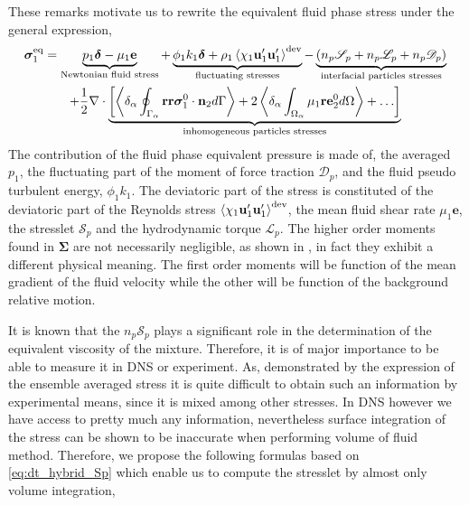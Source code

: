 These remarks motivate us to rewrite the equivalent fluid phase stress under the general expression,  
\begin{multline*}
    \bm{\sigma}_1^\text{eq}
    = 
    \underbrace{p_1  \bm\delta
    - \mu_1 \textbf{e} }_\text{Newtonian fluid stress}
    +  \underbrace{\phi_1 k_1 \bm\delta
    + \rho_1 \left<\chi_1\textbf{u}_1'\textbf{u}_1'\right>^\text{dev}}_\text{fluctuating stresses}
    - \underbrace{(n_p \mathscr{S}_p
    + n_p \mathscr{L}_p
    + n_p \mathscr{D}_p )}_\text{interfacial particles stresses}\\
    + \frac{1}{2} \mathbf{\nabla}\cdot \underbrace{\left[
        \left<\delta_\alpha \oint_{\Gamma_\alpha} \textbf{rr}\bm{\sigma}_1^0\cdot \textbf{n}_2 d\Gamma\right>
        + 2\left<\delta_\alpha \int_{\Omega_\alpha} \mu_1 \textbf{re}_2^0  d\Omega\right>
        + \ldots
        \right]
        }_\text{inhomogeneous particles stresses}
    \label{eq:sigma_eq1_def}
\end{multline*}
The contribution of the fluid phase equivalent pressure is made of,
the averaged $p_1$, the fluctuating part of the moment of force traction $\mathscr{D}_p$, and the fluid pseudo turbulent energy, $\phi_1 k_1$. 
The deviatoric part of the stress is constituted of the deviatoric part of the Reynolds stress $\left<\chi_1\textbf{u}_1'\textbf{u}_1'\right>^\text{dev}$, the mean fluid shear rate $\mu_1 \textbf{e}$, the stresslet $\mathscr{S}_p$ and the hydrodynamic torque $\mathscr{L}_p$. 
The higher order moments found in $\bm{\Sigma}$ are not necessarily negligible, as shown in \citet{lhuillier1996contribution,jackson1997locally}, in fact they exhibit a different physical meaning. 
The first order moments will be function of the mean gradient of the fluid velocity while the other will be function of the background relative motion. 

It is known that the $n_p \mathscr{S}_p$ plays a significant role in the determination of the equivalent viscosity of the mixture. 
Therefore, it is of major importance to be able to measure it in DNS or experiment.
As, demonstrated by the expression of the ensemble averaged stress it is quite difficult to obtain such an information by experimental means, since it is mixed among other stresses.  
In DNS however we have access to pretty much any information, nevertheless surface integration of the stress can be shown to be inaccurate when performing volume of fluid method. 
Therefore, we propose the following formulas based on \ref{eq:dt_hybrid_Sp} which enable us to compute the stresslet by almost only volume integration,  


